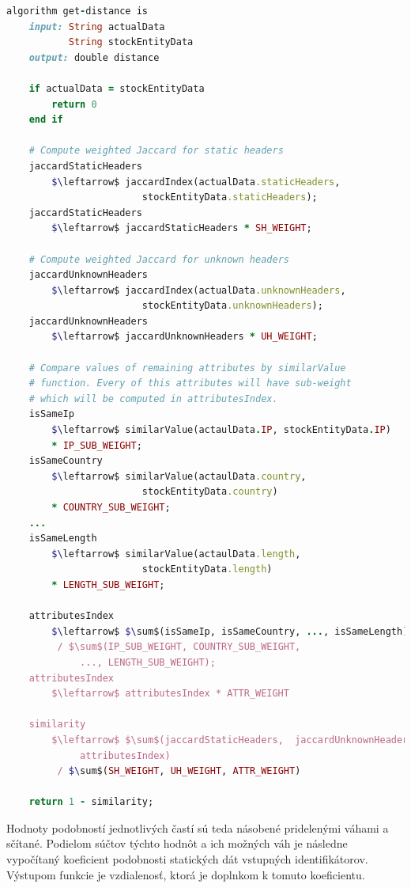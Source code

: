 \documentclass[
  printed, %
  table,   %
  lof,     %
  nolot,   %
  nocover
]{fithesis3}
\begin{document}
\vspace{6mm}
\begin{lstlisting}[basicstyle=\footnotesize, language=Ruby, mathescape=true]
algorithm get-distance is
    input: String actualData
           String stockEntityData
    output: double distance

    if actualData = stockEntityData
        return 0
    end if

    # Compute weighted Jaccard for static headers
    jaccardStaticHeaders 
    	$\leftarrow$ jaccardIndex(actualData.staticHeaders, 
    	                stockEntityData.staticHeaders);
    jaccardStaticHeaders 
    	$\leftarrow$ jaccardStaticHeaders * SH_WEIGHT;

    # Compute weighted Jaccard for unknown headers
    jaccardUnknownHeaders 
    	$\leftarrow$ jaccardIndex(actualData.unknownHeaders,
    	                stockEntityData.unknownHeaders);
    jaccardUnknownHeaders 
    	$\leftarrow$ jaccardUnknownHeaders * UH_WEIGHT;

    # Compare values of remaining attributes by similarValue
    # function. Every of this attributes will have sub-weight
    # which will be computed in attributesIndex.
    isSameIp 
    	$\leftarrow$ similarValue(actaulData.IP, stockEntityData.IP)
    	* IP_SUB_WEIGHT;
    isSameCountry 
    	$\leftarrow$ similarValue(actaulData.country, 
    	                stockEntityData.country)
    	* COUNTRY_SUB_WEIGHT;
    ...
    isSameLength 
    	$\leftarrow$ similarValue(actaulData.length, 
    	                stockEntityData.length)
    	* LENGTH_SUB_WEIGHT;

    attributesIndex 
    	$\leftarrow$ $\sum$(isSameIp, isSameCountry, ..., isSameLength) 
    	 / $\sum$(IP_SUB_WEIGHT, COUNTRY_SUB_WEIGHT,
    	     ..., LENGTH_SUB_WEIGHT);
    attributesIndex 
    	$\leftarrow$ attributesIndex * ATTR_WEIGHT

    similarity 
    	$\leftarrow$ $\sum$(jaccardStaticHeaders,  jaccardUnknownHeaders,
    	     attributesIndex) 
    	 / $\sum$(SH_WEIGHT, UH_WEIGHT, ATTR_WEIGHT)

    return 1 - similarity;
\end{lstlisting}

Hodnoty podobností jednotlivých častí sú teda násobené pridelenými váhami a
sčítané. Podielom súčtov týchto hodnôt a ich možných váh je následne vypočítaný
koeficient podobnosti statických dát vstupných identifikátorov. Výstupom 
funkcie je vzdialenosť, ktorá je doplnkom k tomuto koeficientu.
\end{document}
